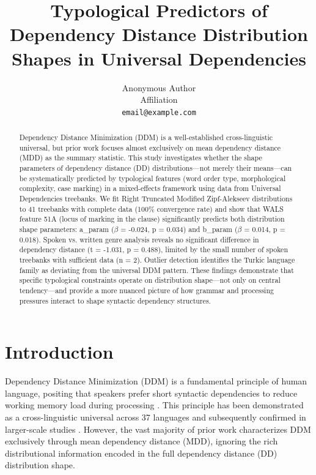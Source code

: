 \documentclass[11pt,letterpaper]{article}
\title{Typological Predictors of Dependency Distance Distribution Shapes in Universal Dependencies}
\author{Anonymous Author\\
  Affiliation\\
  \texttt{email@example.com}
}
\date{}
\begin{document}
\sloppy  %

\maketitle

\begin{abstract}
Dependency Distance Minimization (DDM) is a well-established cross-linguistic universal, but prior work focuses almost exclusively on mean dependency distance (MDD) as the summary statistic. This study investigates whether the shape parameters of dependency distance (DD) distributions---not merely their means---can be systematically predicted by typological features (word order type, morphological complexity, case marking) in a mixed-effects framework using data from Universal Dependencies treebanks. We fit Right Truncated Modified Zipf-Alekseev distributions to 41 treebanks with complete data (100\% convergence rate) and show that WALS feature 51A (locus of marking in the clause) significantly predicts both distribution shape parameters: a\_param ($\beta$ = -0.024, p = 0.034) and b\_param ($\beta$ = 0.014, p = 0.018). Spoken vs. written genre analysis reveals no significant difference in dependency distance (t = -1.031, p = 0.488), limited by the small number of spoken treebanks with sufficient data (n = 2). Outlier detection identifies the Turkic language family as deviating from the universal DDM pattern. These findings demonstrate that specific typological constraints operate on distribution shape---not only on central tendency---and provide a more nuanced picture of how grammar and processing pressures interact to shape syntactic dependency structures.
\end{abstract}

\section{Introduction}

Dependency Distance Minimization (DDM) is a fundamental principle of human language, positing that speakers prefer short syntactic dependencies to reduce working memory load during processing \cite{Futrell2015}. This principle has been demonstrated as a cross-linguistic universal across 37 languages \cite{Futrell2015} and subsequently confirmed in larger-scale studies \cite{Gerdes2026, Niu2023}. However, the vast majority of prior work characterizes DDM exclusively through mean dependency distance (MDD), ignoring the rich distributional information encoded in the full dependency distance (DD) distribution shape.
\end{document}

